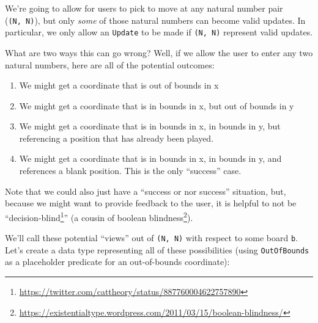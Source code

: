 \documentclass[]{article}
\renewcommand{\href}[2]{#2\footnote{\url{#1}}}
\begin{document}
We're going to allow for users to pick to move at any natural number pair
(\texttt{(N,\ N)}), but only \emph{some} of those natural numbers can become
valid updates. In particular, we only allow an \texttt{Update} to be made if
\texttt{(N,\ N)} represent valid updates.

What are two ways this can go wrong? Well, if we allow the user to enter any two
natural numbers, here are all of the potential outcomes:

\begin{enumerate}
\def\labelenumi{\arabic{enumi}.}
\tightlist
\item
  We might get a coordinate that is out of bounds in x
\item
  We might get a coordinate that is in bounds in x, but out of bounds in y
\item
  We might get a coordinate that is in bounds in x, in bounds in y, but
  referencing a position that has already been played.
\item
  We might get a coordinate that is in bounds in x, in bounds in y, and
  references a blank position. This is the only ``success'' case.
\end{enumerate}

Note that we could also just have a ``success or nor success'' situation, but,
because we might want to provide feedback to the user, it is helpful to not be
``\href{https://twitter.com/cattheory/status/887760004622757890}{decision-blind}''
(a cousin of
\href{https://existentialtype.wordpress.com/2011/03/15/boolean-blindness/}{boolean
blindness}).

We'll call these potential ``views'' out of \texttt{(N,\ N)} with respect to
some board \texttt{b}. Let's create a data type representing all of these
possibilities (using \texttt{OutOfBounds} as a placeholder predicate for an
out-of-bounds coordinate):
\end{document}
